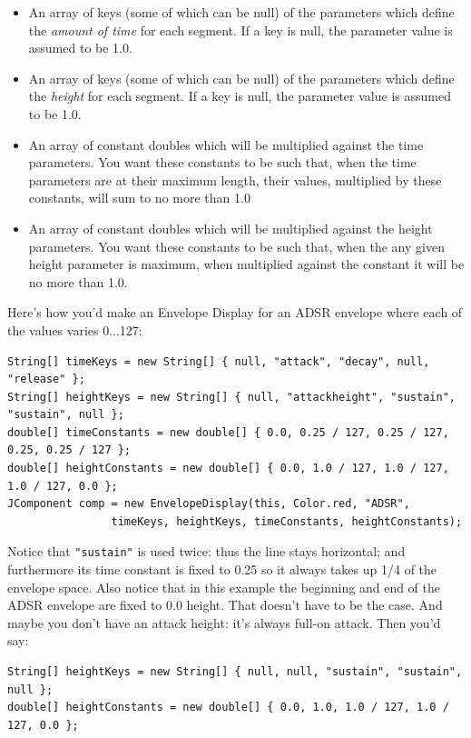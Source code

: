 \documentclass{article}
\begin{document}
\begin{itemize}
\begin{itemize}
\item An array of keys (some of which can be null) of the parameters which define the {\it amount of time} for each segment.  If a key is null, the parameter value is assumed to be 1.0.
\item An array of keys (some of which can be null) of the parameters which define the {\it height} for each segment.  If a key is null, the parameter value is assumed to be 1.0.
\item An array of constant doubles which will be multiplied against the time parameters.  You want these constants to be such that, when the time parameters are at their maximum length, their values, multiplied by these constants, will sum to  no more than 1.0
\item An array of constant doubles which will be multiplied against the height parameters.  You want these constants to be such that, when the any given height parameter is maximum, when multiplied against the constant it will be no more than 1.0.
\end{itemize}

Here's how you'd make an Envelope Display for an ADSR envelope where each of the values varies 0...127:

\begin{verbatim}
String[] timeKeys = new String[] { null, "attack", "decay", null, "release" };
String[] heightKeys = new String[] { null, "attackheight", "sustain", "sustain", null };
double[] timeConstants = new double[] { 0.0, 0.25 / 127, 0.25 / 127, 0.25, 0.25 / 127 };
double[] heightConstants = new double[] { 0.0, 1.0 / 127, 1.0 / 127, 1.0 / 127, 0.0 };
JComponent comp = new EnvelopeDisplay(this, Color.red, "ADSR", 
                timeKeys, heightKeys, timeConstants, heightConstants);
\end{verbatim}

Notice that {\tt "sustain"} is used twice: thus the line stays horizontal; and furthermore its time constant is fixed to 0.25 so it always takes up 1/4 of the envelope space.  Also notice that in this example the beginning and end of the ADSR envelope are fixed to 0.0 height.  That doesn't have to be the case.  And maybe you don't have an attack height: it's always full-on attack.  Then you'd say:

\begin{verbatim}
String[] heightKeys = new String[] { null, null, "sustain", "sustain", null };
double[] heightConstants = new double[] { 0.0, 1.0, 1.0 / 127, 1.0 / 127, 0.0 };
\end{verbatim}


\end{itemize}
\end{document}
